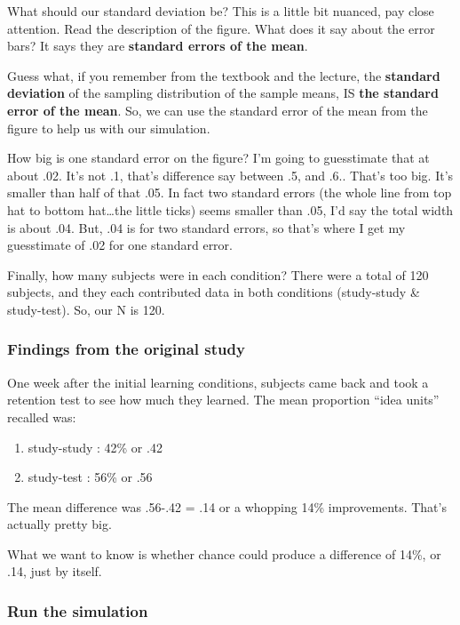 \documentclass[]{book}
\providecommand{\tightlist}{%
  \setlength{\itemsep}{0pt}\setlength{\parskip}{0pt}}
\theoremstyle{definition}
\theoremstyle{definition}
\theoremstyle{definition}
\theoremstyle{remark}
\begin{document}
What should our standard deviation be? This is a little bit nuanced, pay
close attention. Read the description of the figure. What does it say
about the error bars? It says they are \textbf{standard errors of the
mean}.

Guess what, if you remember from the textbook and the lecture, the
\textbf{standard deviation} of the sampling distribution of the sample
means, IS \textbf{the standard error of the mean}. So, we can use the
standard error of the mean from the figure to help us with our
simulation.

How big is one standard error on the figure? I'm going to guesstimate
that at about .02. It's not .1, that's difference say between .5, and
.6.. That's too big. It's smaller than half of that .05. In fact two
standard errors (the whole line from top hat to bottom hat\ldots{}the
little ticks) seems smaller than .05, I'd say the total width is about
.04. But, .04 is for two standard errors, so that's where I get my
guesstimate of .02 for one standard error.

Finally, how many subjects were in each condition? There were a total of
120 subjects, and they each contributed data in both conditions
(study-study \& study-test). So, our N is 120.

\subsubsection{Findings from the original
study}\label{findings-from-the-original-study}

One week after the initial learning conditions, subjects came back and
took a retention test to see how much they learned. The mean proportion
``idea units'' recalled was:

\begin{enumerate}
\def\labelenumi{\arabic{enumi}.}
\tightlist
\item
  study-study : 42\% or .42
\item
  study-test : 56\% or .56
\end{enumerate}

The mean difference was .56-.42 = .14 or a whopping 14\% improvements.
That's actually pretty big.

What we want to know is whether chance could produce a difference of
14\%, or .14, just by itself.

\subsubsection{Run the simulation}\label{run-the-simulation}
\end{document}
